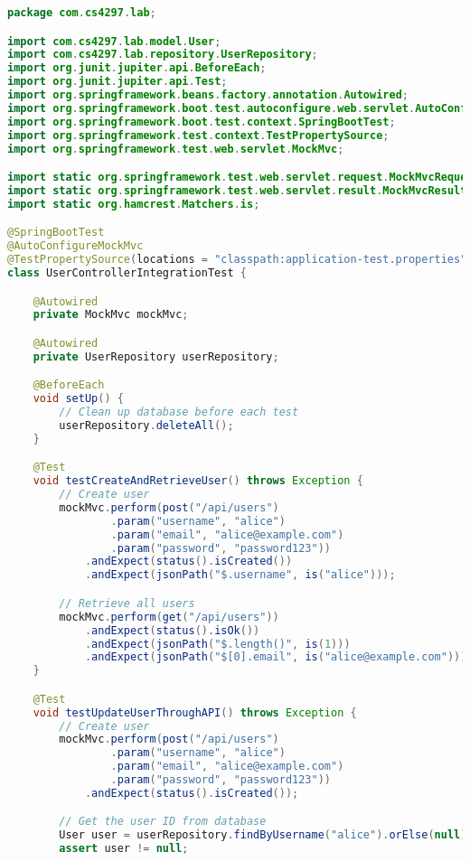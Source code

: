 \documentclass[12pt,a4paper]{article}
\begin{document}
\begin{lstlisting}[language=java, caption=UserControllerIntegrationTest.java - Full Stack Tests]
package com.cs4297.lab;

import com.cs4297.lab.model.User;
import com.cs4297.lab.repository.UserRepository;
import org.junit.jupiter.api.BeforeEach;
import org.junit.jupiter.api.Test;
import org.springframework.beans.factory.annotation.Autowired;
import org.springframework.boot.test.autoconfigure.web.servlet.AutoConfigureMockMvc;
import org.springframework.boot.test.context.SpringBootTest;
import org.springframework.test.context.TestPropertySource;
import org.springframework.test.web.servlet.MockMvc;

import static org.springframework.test.web.servlet.request.MockMvcRequestBuilders.*;
import static org.springframework.test.web.servlet.result.MockMvcResultMatchers.*;
import static org.hamcrest.Matchers.is;

@SpringBootTest
@AutoConfigureMockMvc
@TestPropertySource(locations = "classpath:application-test.properties")
class UserControllerIntegrationTest {

    @Autowired
    private MockMvc mockMvc;

    @Autowired
    private UserRepository userRepository;

    @BeforeEach
    void setUp() {
        // Clean up database before each test
        userRepository.deleteAll();
    }

    @Test
    void testCreateAndRetrieveUser() throws Exception {
        // Create user
        mockMvc.perform(post("/api/users")
                .param("username", "alice")
                .param("email", "alice@example.com")
                .param("password", "password123"))
            .andExpect(status().isCreated())
            .andExpect(jsonPath("$.username", is("alice")));

        // Retrieve all users
        mockMvc.perform(get("/api/users"))
            .andExpect(status().isOk())
            .andExpect(jsonPath("$.length()", is(1)))
            .andExpect(jsonPath("$[0].email", is("alice@example.com")));
    }

    @Test
    void testUpdateUserThroughAPI() throws Exception {
        // Create user
        mockMvc.perform(post("/api/users")
                .param("username", "alice")
                .param("email", "alice@example.com")
                .param("password", "password123"))
            .andExpect(status().isCreated());

        // Get the user ID from database
        User user = userRepository.findByUsername("alice").orElse(null);
        assert user != null;


\end{lstlisting}
\end{document}
